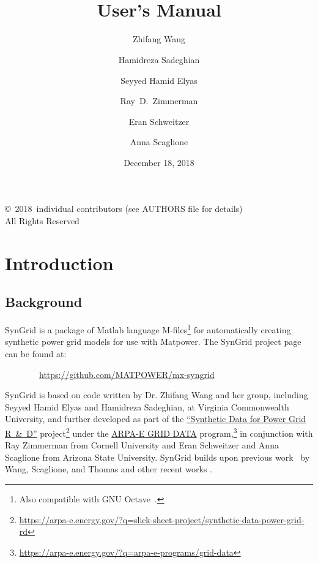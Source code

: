 \documentclass[12pt]{article}
\title{\syngrid{} \syngridver{}\\
User's Manual}
\author{Zhifang Wang \and Hamidreza Sadeghian \and Seyyed Hamid Elyas \and Ray~D.~Zimmerman \and Eran Schweitzer \and Anna Scaglione}
\date{December 18, 2018} %
\newcommand{\matlab}[0]{{\sc Matlab}}
\newcommand{\matpower}[0]{{\sc Matpower}}
\newcommand{\syngrid}[0]{{SynGrid}}
\newcommand{\syngridurl}[0]{https://github.com/MATPOWER/mx-syngrid}
\numberwithin{equation}{section}
\numberwithin{table}{section}
\numberwithin{figure}{section}
\begin{document}
\maketitle
\thispagestyle{empty}
\vfill
\begin{center}
{\scriptsize
\copyright~2018~individual contributors (see AUTHORS file for details)\\
All Rights Reserved}
\end{center}

\clearpage
\tableofcontents
\clearpage
\listoffigures
\listoftables

\clearpage
\section{Introduction}

\subsection{Background}

\syngrid{} is a package of \matlab{} language M-files\footnote{Also compatible with GNU Octave~\cite{octave}.} for automatically creating synthetic power grid models for use with \matpower{}. The \syngrid{} project page can be found at:

\bigskip

~~~~~~~~\url{\syngridurl}

\bigskip

\syngrid{} is based on code written by Dr. Zhifang Wang and her group, including Seyyed Hamid Elyas and Hamidreza Sadeghian, at Virginia Commonwealth University, and further developed as part of the \href{https://arpa-e.energy.gov/?q=slick-sheet-project/synthetic-data-power-grid-rd}{``Synthetic Data for Power Grid R~\&~D''} project\footnote{\url{https://arpa-e.energy.gov/?q=slick-sheet-project/synthetic-data-power-grid-rd}} under the \href{https://arpa-e.energy.gov/?q=arpa-e-programs/grid-data}{ARPA-E GRID DATA} program,\footnote{\url{https://arpa-e.energy.gov/?q=arpa-e-programs/grid-data}} in conjunction with Ray Zimmerman from Cornell University and Eran Schweitzer and Anna Scaglione from Arizona State University.
\syngrid{} builds upon previous work~\cite{wang2008, syngrid_nestedSW} by Wang, Scaglione, and Thomas and other recent works \cite{wang2015, syngrid_bustype, syngrid_scaling, syngrid_gen, syngrid_transmissionline, syngrid_stat, schweitzer2018mathematical}.
\end{document}
